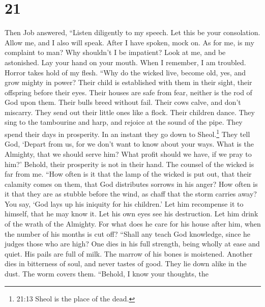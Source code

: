 \hypertarget{section-15}{%
\section{21}\label{section-15}}

 Then Job answered,  ``Listen diligently to my
speech. Let this be your consolation.  Allow me, and I also
will speak. After I have spoken, mock on.  As for me, is my
complaint to man? Why shouldn't I be impatient?  Look at me,
and be astonished. Lay your hand on your mouth.  When I
remember, I am troubled. Horror takes hold of my flesh. 
``Why do the wicked live, become old, yes, and grow mighty in power?
 Their child is established with them in their sight, their
offspring before their eyes.  Their houses are safe from
fear, neither is the rod of God upon them.  Their bulls
breed without fail. Their cows calve, and don't miscarry. 
They send out their little ones like a flock. Their children dance.
 They sing to the tambourine and harp, and rejoice at the
sound of the pipe.  They spend their days in prosperity. In
an instant they go down to Sheol.\footnote{21:13 Sheol is the place of
  the dead.}  They tell God, `Depart from us, for we don't
want to know about your ways.  What is the Almighty, that
we should serve him? What profit should we have, if we pray to him?'
 Behold, their prosperity is not in their hand. The counsel
of the wicked is far from me.  ``How often is it that the
lamp of the wicked is put out, that their calamity comes on them, that
God distributes sorrows in his anger?  How often is it that
they are as stubble before the wind, as chaff that the storm carries
away?  You say, `God lays up his iniquity for his
children.' Let him recompense it to himself, that he may know it.
 Let his own eyes see his destruction. Let him drink of the
wrath of the Almighty.  For what does he care for his house
after him, when the number of his months is cut off? 
``Shall any teach God knowledge, since he judges those who are high?
 One dies in his full strength, being wholly at ease and
quiet.  His pails are full of milk. The marrow of his bones
is moistened.  Another dies in bitterness of soul, and
never tastes of good.  They lie down alike in the dust. The
worm covers them.  ``Behold, I know your thoughts, the
